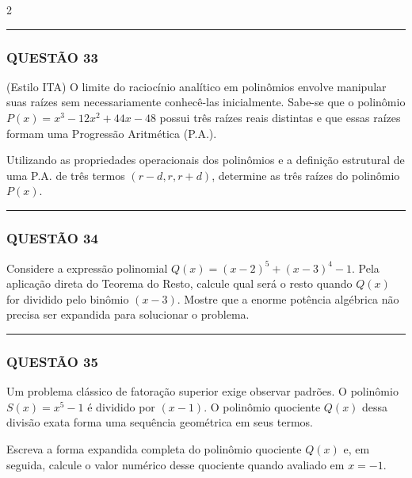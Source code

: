 \documentclass[twoside, 10pt, a4paper]{article}
\begin{document}
\begin{multicols*}{2}
\vspace{0cm} \noindent\textcolor{CorLinha}{\rule{\linewidth}{0.5pt}} \vspace{-0.2cm}
\subsubsection*{QUESTÃO 33}

(Estilo ITA) O limite do raciocínio analítico em polinômios envolve manipular suas raízes sem necessariamente conhecê-las inicialmente. Sabe-se que o polinômio $ P(x) = x^3 - 12x^2 + 44x - 48 $ possui três raízes reais distintas e que essas raízes formam uma Progressão Aritmética (P.A.). 

Utilizando as propriedades operacionais dos polinômios e a definição estrutural de uma P.A. de três termos $ (r - d, r, r + d) $, determine as três raízes do polinômio $ P(x) $.

\vspace{0cm} \noindent\textcolor{CorLinha}{\rule{\linewidth}{0.5pt}} \vspace{-0.2cm}
\subsubsection*{QUESTÃO 34}

Considere a expressão polinomial $ Q(x) = (x - 2)^5 + (x - 3)^4 - 1 $. Pela aplicação direta do Teorema do Resto, calcule qual será o resto quando $ Q(x) $ for dividido pelo binômio $ (x - 3) $. Mostre que a enorme potência algébrica não precisa ser expandida para solucionar o problema.

\vspace{0cm} \noindent\textcolor{CorLinha}{\rule{\linewidth}{0.5pt}} \vspace{-0.2cm}
\subsubsection*{QUESTÃO 35}

Um problema clássico de fatoração superior exige observar padrões. O polinômio $ S(x) = x^5 - 1 $ é dividido por $ (x - 1) $. O polinômio quociente $ Q(x) $ dessa divisão exata forma uma sequência geométrica em seus termos. 

Escreva a forma expandida completa do polinômio quociente $ Q(x) $ e, em seguida, calcule o valor numérico desse quociente quando avaliado em $ x = -1 $.

\end{multicols*}
\end{document}
